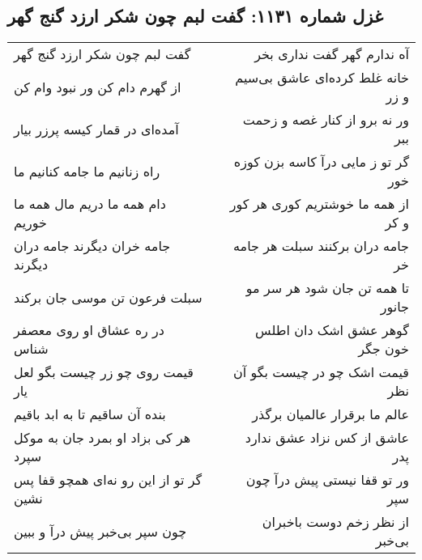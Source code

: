 \begin{center}
\section*{غزل شماره ۱۱۳۱: گفت لبم چون شکر ارزد گنج گهر}
\label{sec:1131}
\begin{longtable}{l p{0.5cm} r}
گفت لبم چون شکر ارزد گنج گهر
&&
آه ندارم گهر گفت نداری بخر
\\
از گهرم دام کن ور نبود وام کن
&&
خانه غلط کرده‌ای عاشق بی‌سیم و زر
\\
آمده‌ای در قمار کیسه پرزر بیار
&&
ور نه برو از کنار غصه و زحمت ببر
\\
راه زنانیم ما جامه کنانیم ما
&&
گر تو ز مایی درآ کاسه بزن کوزه خور
\\
دام همه ما دریم مال همه ما خوریم
&&
از همه ما خوشتریم کوری هر کور و کر
\\
جامه خران دیگرند جامه دران دیگرند
&&
جامه دران برکنند سبلت هر جامه خر
\\
سبلت فرعون تن موسی جان برکند
&&
تا همه تن جان شود هر سر مو جانور
\\
در ره عشاق او روی معصفر شناس
&&
گوهر عشق اشک دان اطلس خون جگر
\\
قیمت روی چو زر چیست بگو لعل یار
&&
قیمت اشک چو در چیست بگو آن نظر
\\
بنده آن ساقیم تا به ابد باقیم
&&
عالم ما برقرار عالمیان برگذر
\\
هر کی بزاد او بمرد جان به موکل سپرد
&&
عاشق از کس نزاد عشق ندارد پدر
\\
گر تو از این رو نه‌ای همچو قفا پس نشین
&&
ور تو قفا نیستی پیش درآ چون سپر
\\
چون سپر بی‌خبر پیش درآ و ببین
&&
از نظر زخم دوست باخبران بی‌خبر
\\
\end{longtable}
\end{center}
